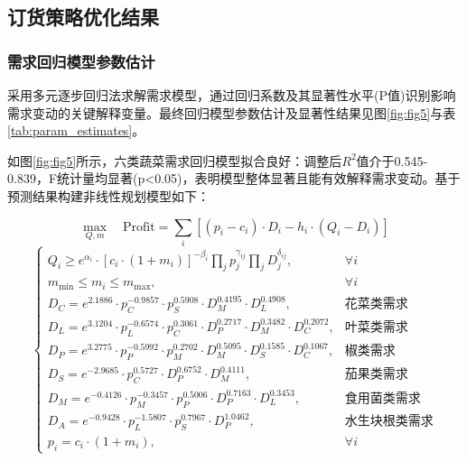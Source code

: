 \documentclass[lang=cn,12pt,a4paper]{elegantpaper}
\begin{document}
\subsection{订货策略优化结果}
\label{subsec:ordering_strategy}

\subsubsection{需求回归模型参数估计}
\label{subsubsec:demand_regression_results}
采用多元逐步回归法求解需求模型，通过回归系数及其显著性水平(P值)识别影响需求变动的关键解释变量。最终回归模型参数估计及显著性结果见图\ref{fig:fig5}与表\ref{tab:param_estimates}。

如图\ref{fig:fig5}所示，六类蔬菜需求回归模型拟合良好：调整后$R^2$值介于0.545-0.839，F统计量均显著(p<0.05)，表明模型整体显著且能有效解释需求变动。基于预测结果构建非线性规划模型如下：

\begin{equation}
\max_{Q,m} \quad \text{Profit} = \sum_i \left[ (p_i - c_i) \cdot D_i - h_i \cdot (Q_i - D_i) \right]
\end{equation}
\begin{equation}
\begin{cases}
Q_i \geq e^{\alpha_i} \cdot \left[ c_i \cdot (1 + m_i) \right]^{-\beta_i} \prod_j p_j^{\gamma_{ij}} \prod_j D_j^{\delta_{ij}}, & \forall i \\
m_{\min} \leq m_i \leq m_{\max}, & \forall i \\
D_C = e^{2.1886} \cdot p_C^{-0.9857} \cdot p_S^{0.5908} \cdot D_M^{0.4195} \cdot D_L^{0.4908}, & \text{花菜类需求} \\
D_L = e^{3.1204} \cdot p_L^{-0.6574} \cdot p_C^{0.3061} \cdot D_P^{0.2717} \cdot D_M^{0.3482} \cdot D_C^{0.2072}, & \text{叶菜类需求} \\
D_P = e^{3.2775} \cdot p_P^{-0.5992} \cdot p_M^{0.2702} \cdot D_M^{0.5095} \cdot D_S^{0.1585} \cdot D_C^{0.1067}, & \text{椒类需求} \\
D_S = e^{-2.9685} \cdot p_C^{0.5727} \cdot D_P^{0.6752} \cdot D_M^{0.4111}, & \text{茄果类需求} \\
D_M = e^{-0.4126} \cdot p_M^{-0.3457} \cdot p_P^{0.5006} \cdot D_P^{0.7163} \cdot D_L^{0.3453}, & \text{食用菌类需求} \\
D_A = e^{-0.9428} \cdot p_L^{-1.5807} \cdot p_S^{0.7967} \cdot D_P^{1.0462}, & \text{水生块根类需求} \\
p_i = c_i \cdot (1 + m_i), & \forall i
\end{cases}
\end{equation}
\end{document}
